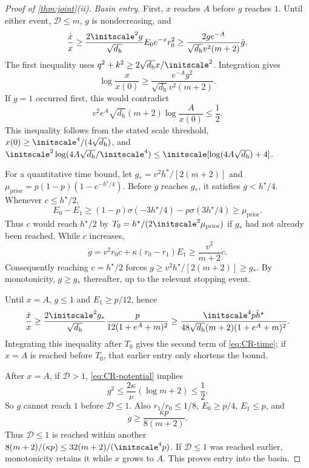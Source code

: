 \begin{proof}[Proof of \cref{thm:joint}(ii)]
\emph{Basin entry.}
First, $x$ reaches $A$ before $g$ reaches $1$. Until either event, $\mathcal D\le m$, $g$ is nondecreasing, and
\[
 \frac{\dot x}{x}\ge\frac{2\initscale^2g}{\sqrt{d_{\mathrm h}}}E_0e^{-x}r_0^2
 \ge\frac{2ge^{-A}}{\sqrt{d_{\mathrm h}}v^2(m+2)}\dot g.
\]
The first inequality uses $q^2+k^2\ge2\sqrt{d_{\mathrm h}}x/\initscale^2$.
Integration gives
\[
 \log\frac{x}{x(0)}\ge\frac{e^{-A}g^2}{\sqrt{d_{\mathrm h}}v^2(m+2)}.
\]
If $g=1$ occurred first, this would contradict
\[
 v^2e^A\sqrt{d_{\mathrm h}}(m+2)\log\frac{A}{x(0)}\le\frac12.
\]
This inequality follows from the stated scale threshold, $x(0)\ge\initscale^4/(4\sqrt{d_{\mathrm h}})$, and
$\initscale^2\log(4A\sqrt{d_{\mathrm h}}/\initscale^4)\le\initscale[\log(4A\sqrt{d_{\mathrm h}})+4]$.

For a quantitative time bound, let $g_*=v^2\bar h^\star/[2(m+2)]$ and
$\mu_{\mathrm{prior}}=p(1-p)(1-e^{-h^\star/4})$.
Before $g$ reaches $g_*$, it satisfies $g<h^\star/4$. Whenever $c\le h^\star/2$,
\[
 E_0-E_1\ge(1-p)\sigma(-3h^\star/4)-p\sigma(3h^\star/4)\ge\mu_{\mathrm{prior}}.
\]
Thus $c$ would reach $h^\star/2$ by $T_0=h^\star/(2\initscale^2\mu_{\mathrm{prior}})$ if $g_*$ had not already been reached.
While $c$ increases,
\[
 \dot g=v^2r_0\dot c+\kappa(r_0-r_1)E_1\ge\frac{v^2}{m+2}\dot c.
\]
Consequently reaching $c=h^\star/2$ forces $g\ge v^2h^\star/[2(m+2)]\ge g_*$.
By monotonicity, $g\ge g_*$ thereafter, up to the relevant stopping event.

Until $x=A$, $g\le1$ and $E_1\ge p/12$, hence
\[
 \frac{\dot x}{x}\ge\frac{2\initscale^2g_*}{\sqrt{d_{\mathrm h}}}
       \frac{p}{12(1+e^A+m)^2}
 \ge\frac{\initscale^4p\bar h^\star}{48\sqrt{d_{\mathrm h}}(m+2)(1+e^A+m)^2}.
\]
Integrating this inequality after $T_0$ gives the second term of \cref{eq:CR-time}; if $x=A$ is reached before $T_0$,
that earlier entry only shortens the bound.

After $x=A$, if $\mathcal D>1$, \eqref{eq:CR-potential} implies
\[
 g^2\le\frac{2\kappa}{\nu}(\log m+2)\le\frac12.
\]
So $g$ cannot reach $1$ before $\mathcal D\le1$. Also $r_1/r_0\le1/8$, $E_0\ge p/4$, $E_1\le p$, and
\[
 \dot g\ge\frac{\kappa p}{8(m+2)}.
\]
Thus $\mathcal D\le1$ is reached within another $8(m+2)/(\kappa p)\le32(m+2)/(\initscale^4p)$.
If $\mathcal D\le1$ was reached earlier, monotonicity retains it while $x$ grows to $A$.
This proves entry into the basin.


\end{proof}
